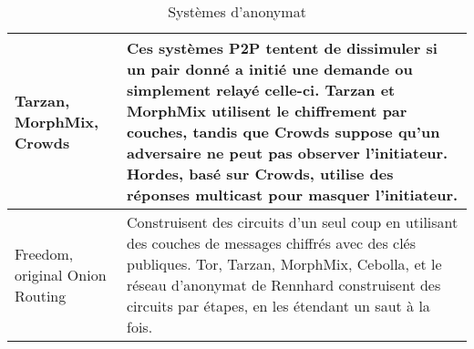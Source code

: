 \begin{table}[htbp]
\begin{tabularx}{\textwidth}{
        >{\raggedright\arraybackslash}p{2cm} 
        >{\raggedright\arraybackslash}X}
    \midrule
    Tarzan, MorphMix, Crowds & Ces systèmes P2P tentent de dissimuler si un pair donné a initié une demande ou simplement relayé celle-ci. Tarzan et MorphMix utilisent le chiffrement par couches, tandis que Crowds suppose qu'un adversaire ne peut pas observer l'initiateur. Hordes, basé sur Crowds, utilise des réponses multicast pour masquer l'initiateur. \\
    \midrule
    Freedom, original Onion Routing & Construisent des circuits d'un seul coup en utilisant des couches de messages chiffrés avec des clés publiques. Tor, Tarzan, MorphMix, Cebolla, et le réseau d'anonymat de Rennhard construisent des circuits par étapes, en les étendant un saut à la fois. \\
    \bottomrule
    \end{tabularx}
    \caption{Systèmes d'anonymat}
    \label{tab:systems}
    \end{table}
    